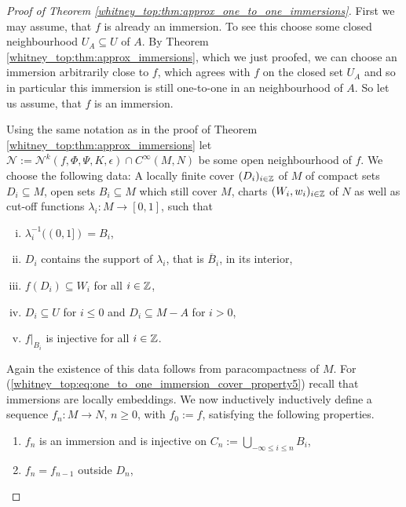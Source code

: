 \begin{proof}[Proof of Theorem \ref{whitney_top:thm:approx_one_to_one_immersions}]
    First we may assume, that $f$ is already an immersion. To see this choose some closed neighbourhood $U_A \subseteq U$ of $A$. By Theorem \ref{whitney_top:thm:approx_immersions}, which we just proofed, we can choose an immersion arbitrarily close to $f$, which agrees with $f$ on the closed set $U_A$ and so in particular this immersion is still one-to-one in an neighbourhood of $A$. So let us assume, that $f$ is an immersion. 
    
    Using the same notation as in the proof of Theorem \ref{whitney_top:thm:approx_immersions} let $\mathcal{N} := \mathcal{N}^k(f,\Phi,\Psi,K,\epsilon) \cap C^\infty(M,N)$ be some open neighbourhood of $f$. We choose the following data: A locally finite cover $(D_i)_{i \in \mathbb{Z}}$ of $M$ of compact sets $D_i \subseteq M$, open sets $B_i \subseteq M$ which still cover $M$, charts $(W_i,w_i)_{i \in \mathbb{Z}}$ of $N$ as well as cut-off functions $\lambda_i \colon M \to [0,1]$, such that 
    \begin{enumerate}[(i)]
        \item \label{whitney_top:eq:one_to_one_immersion_cover_property1} $\lambda_i^{-1}((0,1]) = B_i$,
        \item \label{whitney_top:eq:one_to_one_immersion_cover_property2}$D_i$ contains the support of $\lambda_i$, that is $\overline{B}_i$, in its interior,
        \item $f(D_i) \subseteq W_i$ for all $i \in \mathbb{Z}$,
        \item \label{whitney_top:eq:one_to_one_immersion_cover_property4}$D_i \subseteq U$ for $i \leq 0$ and $D_i \subseteq M - A$ for $i >0$,
        \item \label{whitney_top:eq:one_to_one_immersion_cover_property5}$f|_{B_i}$ is injective for all $i \in \mathbb{Z}$.
    \end{enumerate}
    Again the existence of this data follows from paracompactness of $M$. For (\ref{whitney_top:eq:one_to_one_immersion_cover_property5}) recall that immersions are locally embeddings. We now inductively inductively define a sequence $f_n \colon M \to N$, $n \geq 0$, with $f_0 := f$, satisfying the following properties.
    \begin{enumerate}[1)]
        \item \label{whitney_top:eq:one_to_one_immersion_property_1} $f_n$ is an immersion and is injective on $C_n := \bigcup_{-\infty \leq i \leq n} B_i$,
        \item \label{whitney_top:eq:one_to_one_immersion_property_2} $f_n = f_{n-1}$ outside $D_n$,

\end{enumerate}
\end{proof}
